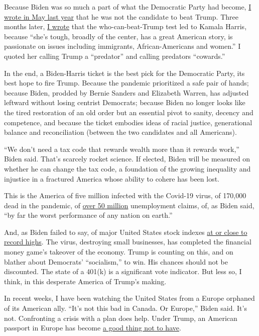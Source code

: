 Because Biden was so much a part of what the Democratic Party had
become,
\href{https://www.nytimes3xbfgragh.onion/2019/05/03/opinion/joe-biden.html}{I
wrote in May last year} that he was not the candidate to beat Trump.
Three months later,
\href{https://www.nytimes3xbfgragh.onion/2019/08/02/opinion/trump-2020-kamala-harris.html}{I
wrote} that the who-can-beat-Trump test led to Kamala Harris, because
``she's tough, broadly of the center, has a great American story, is
passionate on issues including immigrants, African-Americans and
women.'' I quoted her calling Trump a ``predator'' and calling predators
``cowards.''

In the end, a Biden-Harris ticket is the best pick for the Democratic
Party, its best hope to fire Trump. Because the pandemic prioritized a
safe pair of hands; because Biden, prodded by Bernie Sanders and
Elizabeth Warren, has adjusted leftward without losing centrist
Democrats; because Biden no longer looks like the tired restoration of
an old order but an essential pivot to sanity, decency and competence,
and because the ticket embodies ideas of racial justice, generational
balance and reconciliation (between the two candidates and all
Americans).

``We don't need a tax code that rewards wealth more than it rewards
work,'' Biden said. That's scarcely rocket science. If elected, Biden
will be measured on whether he can change the tax code, a foundation of
the growing inequality and injustice in a fractured America whose
ability to cohere has been lost.

This is the America of five million infected with the Covid-19 virus, of
170,000 dead in the pandemic, of
\href{https://www.sfchronicle.com/business/article/More-than-50-million-have-filed-for-unemployment-15412510.php}{over
50 million} unemployment claims, of, as Biden said, ``by far the worst
performance of any nation on earth.''

And, as Biden failed to say, of major United States stock indexes
\href{https://www.nytimes3xbfgragh.onion/2020/08/18/business/stock-market-record.html}{at
or close to record highs}. The virus, destroying small businesses, has
completed the financial money game's takeover of the economy. Trump is
counting on this, and on blather about Democrats' ``socialism,'' to win.
His chances should not be discounted. The state of a 401(k) is a
significant vote indicator. But less so, I think, in this desperate
America of Trump's making.

In recent weeks, I have been watching the United States from a Europe
orphaned of its American ally. ``It's not this bad in Canada. Or
Europe,'' Biden said. It's not. Confronting a crisis with a plan does
help. Under Trump, an American passport in Europe has become
\href{https://www.nytimes3xbfgragh.onion/2020/07/07/world/europe/american-passport-privilege-coronavirus.html}{a
good thing not to have}.

